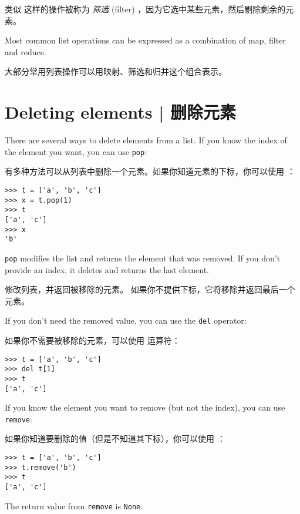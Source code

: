 类似  这样的操作被称为 {\em 筛选} (filter) ，因为它选中某些元素，然后剔除剩余的元素。

Most common list operations can be expressed as a combination
of map, filter and reduce.

大部分常用列表操作可以用映射、筛选和归并这个组合表示。


\section{Deleting elements  |  删除元素}
  

There are several ways to delete elements from a list.  If you
know the index of the element you want, you can use
{\tt pop}:

有多种方法可以从列表中删除一个元素。如果你知道元素的下标，你可以使用  ：

  

\begin{lstlisting}
>>> t = ['a', 'b', 'c']
>>> x = t.pop(1)
>>> t
['a', 'c']
>>> x
'b'
\end{lstlisting}

%
{\tt pop} modifies the list and returns the element that was removed.
If you don't provide an index, it deletes and returns the
last element.

 修改列表，并返回被移除的元素。 如果你不提供下标，它将移除并返回最后一个元素。

If you don't need the removed value, you can use the {\tt del}
operator:

如果你不需要被移除的元素，可以使用  运算符：

  

\begin{lstlisting}
>>> t = ['a', 'b', 'c']
>>> del t[1]
>>> t
['a', 'c']
\end{lstlisting}

%
If you know the element you want to remove (but not the index), you
can use {\tt remove}:

如果你知道要删除的值（但是不知道其下标），你可以使用  ：

  

\begin{lstlisting}
>>> t = ['a', 'b', 'c']
>>> t.remove('b')
>>> t
['a', 'c']
\end{lstlisting}
%
The return value from {\tt remove} is {\tt None}.

